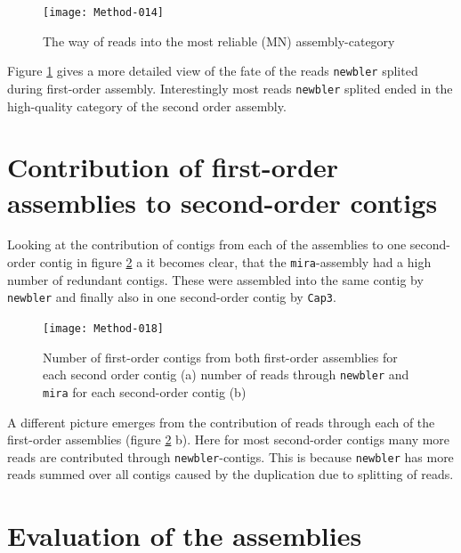 \documentclass[12pt,a4paper]{article}
\begin{document}
\newpage

\begin{figure}[H]
  \centering
  

\texttt{[image: Method-014]}

  \caption{The way of reads into the most reliable (MN) assembly-category}
  \label{fig:venncat}
\end{figure}

Figure \ref{fig:venncat} gives a more detailed view of the fate of the
reads \texttt{newbler} splited during first-order assembly. Interestingly most
reads \texttt{newbler} splited ended in the high-quality category of the
second order assembly.

\section{Contribution of first-order assemblies to second-order contigs}
\label{sec:contr-firs-order}

  

Looking at the contribution of contigs from each of the assemblies to
one second-order contig in figure \ref{fig:rcp} a it becomes clear,
that the \texttt{mira}-assembly had a high number of redundant
contigs. These were assembled into the same contig by \texttt{newbler}
and finally also in one second-order contig by \texttt{Cap3}.


\begin{figure}[H]
  \centering

\texttt{[image: Method-018]}


\caption{Number of first-order contigs from both first-order
  assemblies for each second order contig (a) number of reads through
  \texttt{newbler} and \texttt{mira} for each second-order contig (b)}
\label{fig:rcp}
  
\end{figure}


A different picture emerges from the contribution of reads through
each of the first-order assemblies (figure \ref{fig:rcp} b). Here for
most second-order contigs many more reads are contributed through
\texttt{newbler}-contigs. This is because \texttt{newbler} has more
reads summed over all contigs caused by the duplication due to
splitting of reads.

\newpage

\section{Evaluation of the assemblies}
\label{sec:eval-three-assembl}
\end{document}
